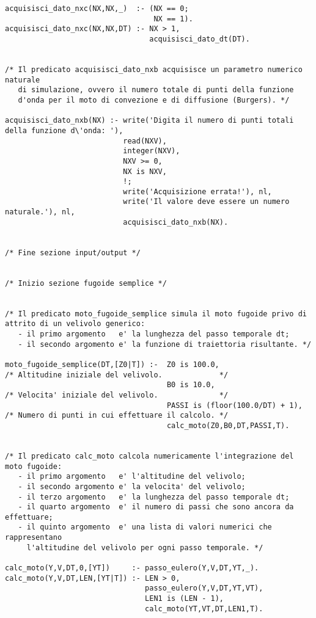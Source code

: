 \begin{verbatim}
acquisisci_dato_nxc(NX,NX,_)  :- (NX == 0;
                                  NX == 1).
acquisisci_dato_nxc(NX,NX,DT) :- NX > 1,
                                 acquisisci_dato_dt(DT).


/* Il predicato acquisisci_dato_nxb acquisisce un parametro numerico naturale 
   di simulazione, ovvero il numero totale di punti della funzione
   d'onda per il moto di convezione e di diffusione (Burgers). */

acquisisci_dato_nxb(NX) :- write('Digita il numero di punti totali della funzione d\'onda: '),
                           read(NXV),
                           integer(NXV),
                           NXV >= 0,
                           NX is NXV,
                           !;     
                           write('Acquisizione errata!'), nl,
                           write('Il valore deve essere un numero naturale.'), nl,
                           acquisisci_dato_nxb(NX).

      
/* Fine sezione input/output */


/* Inizio sezione fugoide semplice */


/* Il predicato moto_fugoide_semplice simula il moto fugoide privo di attrito di un velivolo generico:
   - il primo argomento   e' la lunghezza del passo temporale dt;
   - il secondo argomento e' la funzione di traiettoria risultante. */

moto_fugoide_semplice(DT,[Z0|T]) :-  Z0 is 100.0,                    /* Altitudine iniziale del velivolo.             */
                                     B0 is 10.0,                     /* Velocita' iniziale del velivolo.              */
                                     PASSI is (floor(100.0/DT) + 1), /* Numero di punti in cui effettuare il calcolo. */
                                     calc_moto(Z0,B0,DT,PASSI,T).


/* Il predicato calc_moto calcola numericamente l'integrazione del moto fugoide:
   - il primo argomento   e' l'altitudine del velivolo;
   - il secondo argomento e' la velocita' del velivolo;
   - il terzo argomento   e' la lunghezza del passo temporale dt;
   - il quarto argomento  e' il numero di passi che sono ancora da effettuare;
   - il quinto argomento  e' una lista di valori numerici che rappresentano 
     l'altitudine del velivolo per ogni passo temporale. */

calc_moto(Y,V,DT,0,[YT])     :- passo_eulero(Y,V,DT,YT,_).  
calc_moto(Y,V,DT,LEN,[YT|T]) :- LEN > 0,
                                passo_eulero(Y,V,DT,YT,VT),
                                LEN1 is (LEN - 1),
                                calc_moto(YT,VT,DT,LEN1,T).



\end{verbatim}

